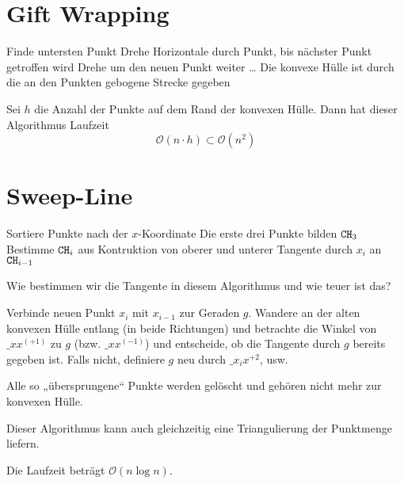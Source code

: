 \documentclass[11pt]{scrbook}
\renewcommand{\O}{\mathcal{O}}
\begin{document}
\section{Gift Wrapping}

\begin{alg}
	\begin{algorithmic}
		\State Finde untersten Punkt
		\State Drehe Horizontale durch Punkt, bis nächster Punkt getroffen wird
		\State Drehe um den neuen Punkt weiter
		\State \dots
		\State Die konvexe Hülle ist durch die an den Punkten gebogene Strecke gegeben
	\end{algorithmic}
	Sei $h$ die Anzahl der Punkte auf dem Rand der konvexen Hülle.
	Dann hat dieser Algorithmus Laufzeit
	\[
		\O(n\cdot h) \subset \O(n^2)
	\]
\end{alg}

\section{Sweep-Line}

\begin{alg}
	\begin{algorithmic}
		\State Sortiere Punkte nach der $x$-Koordinate
		\State Die erste drei Punkte bilden $\texttt{CH}_3$
		\For{$i=4,\dotsc,n$}
			\State Bestimme $\texttt{CH}_i$ aus Kontruktion von oberer und unterer Tangente durch $x_i$ an $\texttt{CH}_{i-1}$
		\EndFor
	\end{algorithmic}
\end{alg}

Wie bestimmen wir die Tangente in diesem Algorithmus und wie teuer ist das?

Verbinde neuen Punkt $x_i$ mit $x_{i-1}$ zur Geraden $g$.
Wandere an der alten konvexen Hülle entlang (in beide Richtungen) und betrachte die Winkel von $\_{xx^{(+1)}}$ zu $g$ (bzw. $\_{xx^{(-1)}}$) und entscheide, ob die Tangente durch $g$ bereits gegeben ist.
Falls nicht, definiere $g$ neu durch $\_{x_ix^{+2}}$, usw.

Alle so „übersprungene“ Punkte werden gelöscht und gehören nicht mehr zur konvexen Hülle.


\begin{note}
	Dieser Algorithmus kann auch gleichzeitig eine Triangulierung der Punktmenge liefern.
\end{note}

Die Laufzeit beträgt $\O(n\log n)$.
\end{document}
